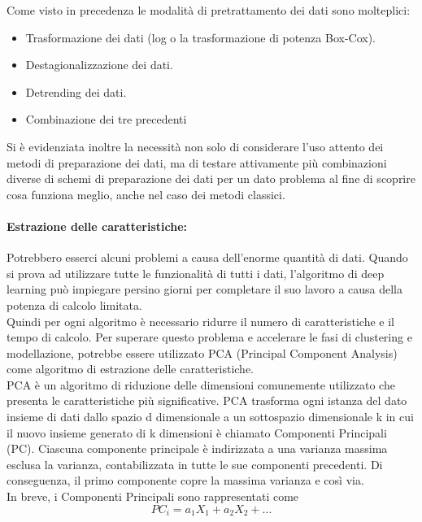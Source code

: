 \documentclass[12pt,a4paper]{report}
\begin{document}
Come visto in precedenza le modalità di pretrattamento dei dati sono molteplici:
\begin{itemize}
    \item Trasformazione dei dati (log o la trasformazione di potenza Box-Cox).
    \item Destagionalizzazione dei dati.
    \item Detrending dei dati.
    \item Combinazione dei tre precedenti
\end{itemize}

Si è evidenziata inoltre la necessità non solo di considerare l'uso attento dei metodi di preparazione dei dati, ma di testare attivamente più combinazioni diverse di schemi di preparazione dei dati per un dato problema al fine di scoprire cosa funziona meglio, anche nel caso dei metodi classici.\\

\paragraph*{Estrazione delle caratteristiche:}
Potrebbero esserci alcuni problemi a causa dell'enorme quantità di dati. Quando si prova ad utilizzare tutte le funzionalità di tutti i dati, l'algoritmo di deep learning può impiegare persino giorni per completare il suo lavoro a causa della potenza di calcolo limitata. \cite{kilimci2019improved}\\
Quindi per ogni algoritmo è necessario ridurre il numero di caratteristiche e il tempo di calcolo. Per superare questo problema e accelerare le fasi di clustering e modellazione, potrebbe essere utilizzato PCA (Principal Component Analysis) come algoritmo di estrazione delle caratteristiche.\\
PCA è un algoritmo di riduzione delle dimensioni comunemente utilizzato che presenta le caratteristiche più significative. PCA trasforma ogni istanza del dato insieme di dati dallo spazio d dimensionale a un sottospazio dimensionale k in cui il nuovo insieme generato di k dimensioni è chiamato Componenti Principali (PC). Ciascuna componente principale è indirizzata a una varianza massima esclusa la varianza, contabilizzata in tutte le sue componenti precedenti. Di conseguenza, il primo componente copre la massima varianza e così via.\\
In breve, i Componenti Principali sono rappresentati come \cite{kilimci2019improved}
\begin{equation}
    {\displaystyle PC_i = a_1X_1 + a_2X_2 + ...}
\end{equation}
\end{document}
